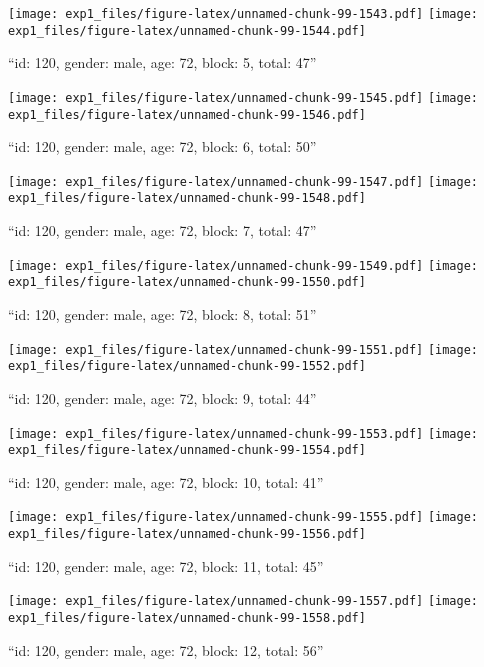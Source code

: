 \documentclass[,]{article}
\begin{document}
\texttt{[image: exp1\_files/figure-latex/unnamed-chunk-99-1543.pdf]}
\texttt{[image: exp1\_files/figure-latex/unnamed-chunk-99-1544.pdf]}

\newpage
[1] 

``id: 120, gender: male, age: 72, block: 5, total: 47''

\texttt{[image: exp1\_files/figure-latex/unnamed-chunk-99-1545.pdf]}
\texttt{[image: exp1\_files/figure-latex/unnamed-chunk-99-1546.pdf]}

\newpage
[1] 

``id: 120, gender: male, age: 72, block: 6, total: 50''

\texttt{[image: exp1\_files/figure-latex/unnamed-chunk-99-1547.pdf]}
\texttt{[image: exp1\_files/figure-latex/unnamed-chunk-99-1548.pdf]}

\newpage
[1] 

``id: 120, gender: male, age: 72, block: 7, total: 47''

\texttt{[image: exp1\_files/figure-latex/unnamed-chunk-99-1549.pdf]}
\texttt{[image: exp1\_files/figure-latex/unnamed-chunk-99-1550.pdf]}

\newpage
[1] 

``id: 120, gender: male, age: 72, block: 8, total: 51''

\texttt{[image: exp1\_files/figure-latex/unnamed-chunk-99-1551.pdf]}
\texttt{[image: exp1\_files/figure-latex/unnamed-chunk-99-1552.pdf]}

\newpage
[1] 

``id: 120, gender: male, age: 72, block: 9, total: 44''

\texttt{[image: exp1\_files/figure-latex/unnamed-chunk-99-1553.pdf]}
\texttt{[image: exp1\_files/figure-latex/unnamed-chunk-99-1554.pdf]}

\newpage
[1] 

``id: 120, gender: male, age: 72, block: 10, total: 41''

\texttt{[image: exp1\_files/figure-latex/unnamed-chunk-99-1555.pdf]}
\texttt{[image: exp1\_files/figure-latex/unnamed-chunk-99-1556.pdf]}

\newpage
[1] 

``id: 120, gender: male, age: 72, block: 11, total: 45''

\texttt{[image: exp1\_files/figure-latex/unnamed-chunk-99-1557.pdf]}
\texttt{[image: exp1\_files/figure-latex/unnamed-chunk-99-1558.pdf]}

\newpage
[1] 

``id: 120, gender: male, age: 72, block: 12, total: 56''
\end{document}

